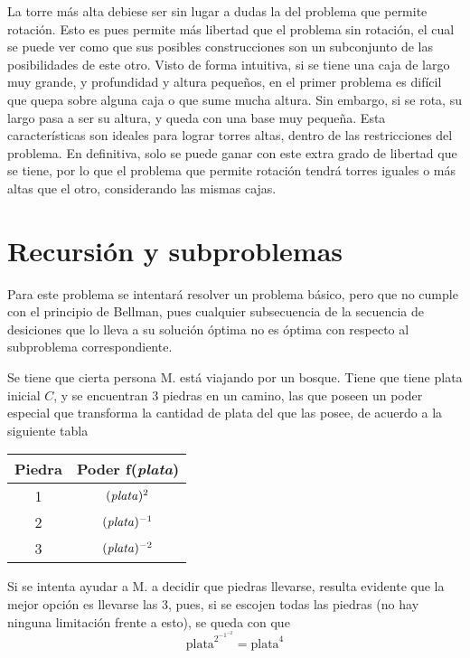 \documentclass[letterpaper,10pt]{article}
\begin{document}
La torre más alta debiese ser sin lugar a dudas la del problema que permite rotación. Esto es pues permite más libertad que el problema sin rotación, el cual se puede ver como que sus posibles construcciones son un subconjunto de las posibilidades de este otro. Visto de forma intuitiva, si se tiene una caja de largo muy grande, y profundidad y altura pequeños, en el primer problema es difícil que quepa sobre alguna caja o que sume mucha altura. Sin embargo, si se rota, su largo pasa a ser su altura, y queda con una base muy pequeña. Esta características son ideales para lograr torres altas, dentro de las restricciones del problema. En definitiva, solo se puede ganar con este extra grado de libertad que se tiene, por lo que el problema que permite rotación tendrá torres iguales o más altas que el otro, considerando las mismas cajas.

\section{Recursión y subproblemas}

Para este problema se intentará resolver un problema básico, pero que no cumple con el principio de Bellman, pues cualquier subsecuencia de la secuencia de desiciones que lo lleva a su solución óptima no es óptima con respecto al subproblema correspondiente. 

Se tiene que cierta persona M. está viajando por un bosque. Tiene que tiene plata inicial $C$, y se encuentran 3 piedras en un camino, las que poseen un poder especial que transforma la cantidad de plata del que las posee, de acuerdo a la siguiente tabla

\begin{center}
    \begin{tabular}{c|c}
      Piedra & Poder f(\textit{plata}) \\\hline
      1 & $(\text{\textit{plata}})^{2}$ \\
      2 & $(\text{\textit{plata}})^{-1}$ \\
      3 & $(\text{\textit{plata}})^{-2}$ \\
    \end{tabular}
  \end{center}
  
 Si se intenta ayudar a M. a decidir que piedras llevarse, resulta evidente que la mejor opción es llevarse las 3, pues, si se escojen todas las piedras (no hay ninguna limitación frente a esto), se queda con que 
 $$\text{plata}^{2^{{-1}^{-2}}} = \text{plata}^4$$ 
 
\end{document}
